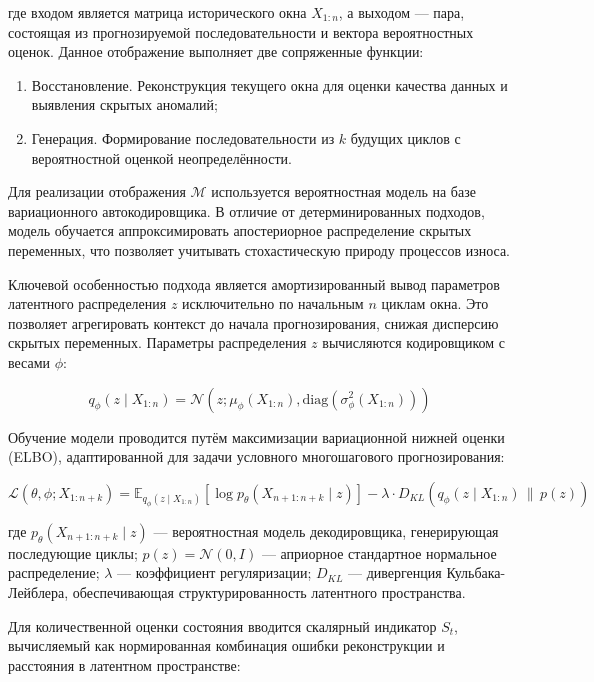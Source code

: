 \documentclass[14pt, a4paper, oneside]{extreport}
\begin{document}
где входом является матрица исторического окна $X_{1:n}$, а выходом — пара, состоящая из прогнозируемой последовательности и вектора вероятностных оценок. Данное отображение выполняет две сопряженные функции:
\begin{enumerate}
\item Восстановление. Реконструкция текущего окна для оценки качества данных и выявления скрытых аномалий;
\item Генерация. Формирование последовательности из $k$ будущих циклов с вероятностной оценкой неопределённости.
\end{enumerate}

Для реализации отображения $\mathcal{M}$ используется вероятностная модель на базе вариационного автокодировщика. В отличие от детерминированных подходов, модель обучается аппроксимировать апостериорное распределение скрытых переменных, что позволяет учитывать стохастическую природу процессов износа.

Ключевой особенностью подхода является амортизированный вывод параметров латентного распределения $z$ исключительно по начальным $n$ циклам окна. Это позволяет агрегировать контекст до начала прогнозирования, снижая дисперсию скрытых переменных. Параметры распределения $z$ вычисляются кодировщиком с весами $\phi$:

\begin{equation}
q_\phi(z \mid X_{1:n}) = \mathcal{N}(z; \mu_\phi(X_{1:n}), \text{diag}(\sigma^2_\phi(X_{1:n})))
\end{equation}

Обучение модели проводится путём максимизации вариационной нижней оценки (ELBO), адаптированной для задачи условного многошагового прогнозирования:

\begin{equation}
\mathcal{L}(\theta, \phi; X_{1:n+k}) = \mathbb{E}_{q_\phi(z \mid X_{1:n})} \left[ \log p_\theta(X_{n+1:n+k} \mid z) \right] - \lambda \cdot D_{KL}\left( q_\phi(z \mid X_{1:n}) \,\|\, p(z) \right)
\end{equation}

где $p_\theta(X_{n+1:n+k} \mid z)$ — вероятностная модель декодировщика, генерирующая последующие циклы; $p(z) = \mathcal{N}(0, I)$ — априорное стандартное нормальное распределение; $\lambda$ — коэффициент регуляризации; $D_{KL}$ — дивергенция Кульбака-Лейблера, обеспечивающая структурированность латентного пространства.

Для количественной оценки состояния вводится скалярный индикатор $S_t$, вычисляемый как нормированная комбинация ошибки реконструкции и расстояния в латентном пространстве:
\end{document}
